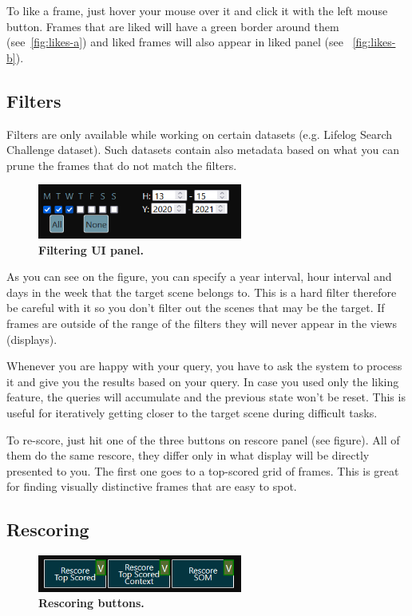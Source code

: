 To like a frame, just hover your mouse over it and click it with the left mouse button. Frames that are liked will have a green border around them (see~\cref{fig:likes-a}) and liked frames will also appear in liked panel (see ~\cref{fig:likes-b}).

\subsection{Filters}
Filters are only available while working on certain datasets (e.g. Lifelog Search Challenge dataset). Such datasets contain also metadata based on what you can prune the frames that do not match the filters.

\begin{figure}[h]
	\centering
	\includegraphics[width=0.6\textwidth]{img/filters.png}
  \caption{\textbf{Filtering UI panel.}}
	\label{fig:filters}
\end{figure}

As you can see on the figure, you can specify a year interval, hour interval and days in the week that the target scene belongs to. This is a hard filter therefore be careful with it so you don't filter out the scenes that may be the target. If frames are outside of the range of the filters they will never appear in the views (displays).


Whenever you are happy with your query, you have to ask the system to process it and give you the results based on your query. In case you used only the liking feature, the queries will accumulate and the previous state won't be reset. This is useful for iteratively getting closer to the target scene during difficult tasks.

To re-score, just hit one of the three buttons on rescore panel (see figure). All of them do the same rescore, they differ only in what display will be directly presented to you. 
The first one goes to a top-scored grid of frames. This is great for finding visually distinctive frames that are easy to spot.

\subsection{Rescoring}
\begin{figure}[h]
	\centering
	\includegraphics[width=0.6\textwidth]{img/rescore-buttons.png}
  \caption{\textbf{Rescoring buttons.}}
	\label{fig:rescore}
\end{figure}

